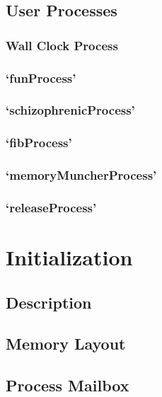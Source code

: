 \documentclass[12pt]{report}
\begin{document}
\section{User Processes}
\label{sec:user_processes}

\subsection{Wall Clock Process}
\label{sec:wall_clock_process}

\subsection{`funProcess'}

\subsection{`schizophrenicProcess'}

\subsection{`fibProcess'}

\subsection{`memoryMuncherProcess'}

\subsection{`releaseProcess'}



\chapter{Initialization}

\section{Description}

\section{Memory Layout}

\section{Process Mailbox}
\end{document}
